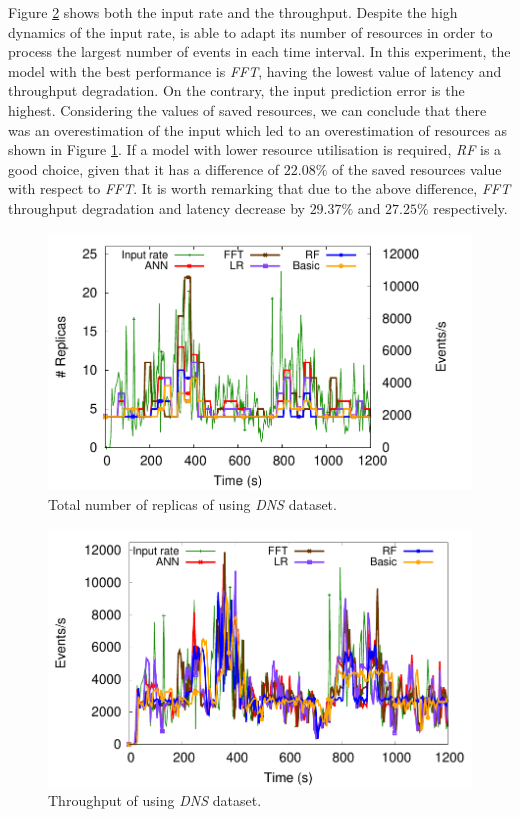 Figure \ref{fig:exp-pa-dns-throughput} shows both the input rate and the throughput. Despite the high dynamics of the input rate, \pSPS{} is able to adapt its number of resources in order to process the largest number of events in each time interval.
In this experiment, the model with the best performance is \textit{FFT}, having the lowest value of latency and throughput degradation. On the contrary, the input prediction error is the highest. Considering the values of saved resources, we can conclude that there was an overestimation of the input which led to an overestimation of resources as shown in Figure \ref{fig:exp-pa-dns-replicas}.
If a model with lower resource utilisation is required, \textit{RF} is a good choice, given that it has a difference of $22.08\%$ of the saved resources value with respect to \textit{FFT}. It is worth remarking that due to the above difference, \textit{FFT} throughput degradation and latency decrease by $29.37\%$ and $27.25\%$ respectively.

\begin{figure}[!ht]
    \centering
    \includegraphics[width=0.75\linewidth]{figures/exp/predictive/DNS-Replicas.pdf}
    \caption{Total number of replicas of \pSPS{} using \textit{DNS} dataset.}
    \label{fig:exp-pa-dns-replicas}
\end{figure}

\begin{figure}[!ht]
    \centering
    \includegraphics[width=0.75\linewidth]{figures/exp/predictive/DNS-Throughput.pdf}
    \caption{Throughput of \pSPS{} using \textit{DNS} dataset.}
    \label{fig:exp-pa-dns-throughput}
\end{figure}

